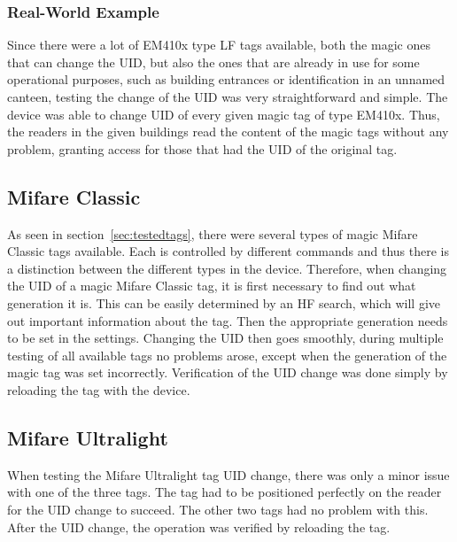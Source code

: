 \subsubsection{Real-World Example}
Since there were a lot of EM410x type LF tags available, both the magic ones that can change the UID, but also the ones that are already in use for some operational purposes, such as building entrances or identification in an unnamed canteen, testing the change of the UID was very straightforward and simple. The device was able to change UID of every given magic tag of type EM410x. Thus, the readers in the given buildings read the content of the magic tags without any problem, granting access for those that had the UID of the original tag. 

\subsection{Mifare Classic}
As seen in section~\ref{sec:testedtags}, there were several types of magic Mifare Classic tags available. Each is controlled by different commands and thus there is a distinction between the different types in the device. Therefore, when changing the UID of a magic Mifare Classic tag, it is first necessary to find out what generation it is. This can be easily determined by an HF search, which will give out important information about the tag. Then the appropriate generation needs to be set in the settings. Changing the UID then goes smoothly, during multiple testing of all available tags no problems arose, except when the generation of the magic tag was set incorrectly. Verification of the UID change was done simply by reloading the tag with the device.


\subsection{Mifare Ultralight}
When testing the Mifare Ultralight tag UID change, there was only a minor issue with one of the three tags. The tag had to be positioned perfectly on the reader for the UID change to succeed. The other two tags had no problem with this. After the UID change, the operation was verified by reloading the tag.
